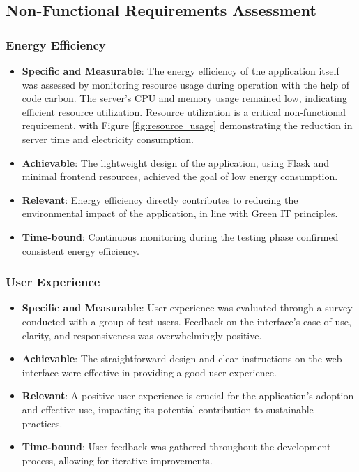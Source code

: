 \documentclass[conference,compsoc]{IEEEtran}
\begin{document}
\subsection{Non-Functional Requirements Assessment}
\subsubsection{Energy Efficiency}
\begin {itemize}
\item \textbf{Specific and Measurable}: The energy efficiency of the application itself was assessed by monitoring resource usage during operation with the help of code carbon. The server's CPU and memory usage remained low, indicating efficient resource utilization. Resource utilization is a critical non-functional requirement, with Figure \ref{fig:resource_usage} demonstrating the reduction in server time and electricity consumption.

\item \textbf{Achievable}: The lightweight design of the application, using Flask and minimal frontend resources, achieved the goal of low energy consumption.

\item \textbf{Relevant}: Energy efficiency directly contributes to reducing the environmental impact of the application, in line with Green IT principles.

\item \textbf{Time-bound}: Continuous monitoring during the testing phase confirmed consistent energy efficiency.
\end {itemize}

\subsubsection{User Experience}
\begin {itemize}
\item \textbf{Specific and Measurable}: User experience was evaluated through a survey conducted with a group of test users. Feedback on the interface's ease of use, clarity, and responsiveness was overwhelmingly positive.

\item \textbf{Achievable}: The straightforward design and clear instructions on the web interface were effective in providing a good user experience.

\item \textbf{Relevant}: A positive user experience is crucial for the application's adoption and effective use, impacting its potential contribution to sustainable practices.

\item \textbf{Time-bound}: User feedback was gathered throughout the development process, allowing for iterative improvements.
\end {itemize}
\end{document}
